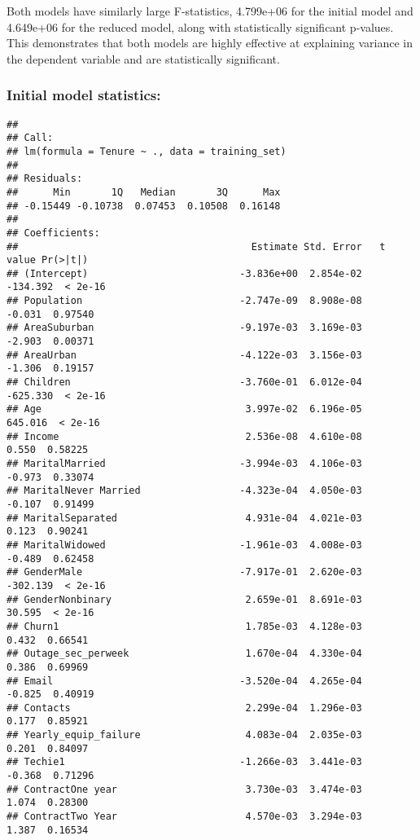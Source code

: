 \documentclass[
]{article}
\begin{document}
Both models have similarly large F-statistics, 4.799e+06 for the initial
model and 4.649e+06 for the reduced model, along with statistically
significant p-values. This demonstrates that both models are highly
effective at explaining variance in the dependent variable and are
statistically significant.

\subsubsection{Initial model
statistics:}\label{initial-model-statistics}

\begin{verbatim}
## 
## Call:
## lm(formula = Tenure ~ ., data = training_set)
## 
## Residuals:
##      Min       1Q   Median       3Q      Max 
## -0.15449 -0.10738  0.07453  0.10508  0.16148 
## 
## Coefficients:
##                                        Estimate Std. Error   t value Pr(>|t|)
## (Intercept)                          -3.836e+00  2.854e-02  -134.392  < 2e-16
## Population                           -2.747e-09  8.908e-08    -0.031  0.97540
## AreaSuburban                         -9.197e-03  3.169e-03    -2.903  0.00371
## AreaUrban                            -4.122e-03  3.156e-03    -1.306  0.19157
## Children                             -3.760e-01  6.012e-04  -625.330  < 2e-16
## Age                                   3.997e-02  6.196e-05   645.016  < 2e-16
## Income                                2.536e-08  4.610e-08     0.550  0.58225
## MaritalMarried                       -3.994e-03  4.106e-03    -0.973  0.33074
## MaritalNever Married                 -4.323e-04  4.050e-03    -0.107  0.91499
## MaritalSeparated                      4.931e-04  4.021e-03     0.123  0.90241
## MaritalWidowed                       -1.961e-03  4.008e-03    -0.489  0.62458
## GenderMale                           -7.917e-01  2.620e-03  -302.139  < 2e-16
## GenderNonbinary                       2.659e-01  8.691e-03    30.595  < 2e-16
## Churn1                                1.785e-03  4.128e-03     0.432  0.66541
## Outage_sec_perweek                    1.670e-04  4.330e-04     0.386  0.69969
## Email                                -3.520e-04  4.265e-04    -0.825  0.40919
## Contacts                              2.299e-04  1.296e-03     0.177  0.85921
## Yearly_equip_failure                  4.083e-04  2.035e-03     0.201  0.84097
## Techie1                              -1.266e-03  3.441e-03    -0.368  0.71296
## ContractOne year                      3.730e-03  3.474e-03     1.074  0.28300
## ContractTwo Year                      4.570e-03  3.294e-03     1.387  0.16534

\end{verbatim}
\end{document}
